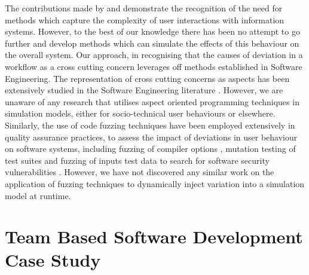 \documentclass{llncs}
\begin{document}
The contributions made by \citet{herrmann1999vagueness} and \citet{sommerville09deriving} demonstrate the recognition of
the need for methods which capture the complexity of user interactions with information systems.  However, to the best
of our knowledge there has been no attempt to go further and develop methods which can simulate the effects of this
behaviour on the overall system.  Our approach, in recognising that the causes of deviation in a workflow as a cross
cutting concern leverages off methods established in Software Engineering. The representation of cross cutting concerns
as aspects has been extensively studied in the Software Engineering literature \citep{Ali2012Aspect}.  However, we are
unaware of any research that utilises aspect oriented programming techniques in simulation models, either for
socio-technical user behaviours or elsewhere.  Similarly, the use of code fuzzing techniques have been employed
extensively in quality assurance practices, to assess the impact of deviations in user behaviour on software systems,
including fuzzing of compiler options \citep{fuzzing-compiler}, mutation testing of test suites \cite{demillo78hints}
and fuzzing of inputs test data to search for software security vulnerabilities \citep{takanen08fuzzing}.  However, we
have not discovered any similar work on the application of fuzzing techniques to dynamically inject variation into a
simulation model at runtime.


\section{Team Based Software Development Case Study}
\label{sec:case-study}

\end{document}
